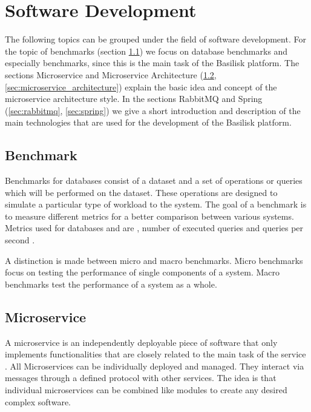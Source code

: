 \section{Software Development}
\label{sec:software_dev}
The following topics can be grouped under the field of software development.
For the topic of benchmarks (section \ref{sec:benchmark}) we focus on database benchmarks and especially \ts{} benchmarks, since this is the main task of the Basilisk platform.
The sections Microservice and Microservice Architecture (\ref{sec:microservice}, \ref{sec:microservice_architecture}) explain the basic idea and concept of the microservice architecture style.
In the sections RabbitMQ and Spring (\ref{sec:rabbitmq}, \ref{sec:spring}) we give a short introduction and description of the main technologies that are used for the development of the Basilisk platform.

\subsection{Benchmark}
\label{sec:benchmark}
Benchmarks for databases consist of a dataset and a set of operations or queries which will be performed on the dataset.
These operations are designed to simulate a particular type of workload to the system.
The goal of a benchmark is to measure different metrics for a better comparison between various systems.
Metrics used for databases and \tsp{} are \eg, number of executed queries and queries per second \cite{IguanaDocsMetrics}.

A distinction is made between micro and macro benchmarks.
Micro benchmarks focus on testing the performance of single components of a system.
Macro benchmarks test the performance of a system as a whole.

\subsection{Microservice}
\label{sec:microservice}
A microservice is an independently deployable piece of software that only implements functionalities that are closely related to the main task of the service \cite{dragoniMicroservicesYesterdayToday2017}.
All Microservices can be individually deployed and managed.
They interact via messages through a defined protocol with other services.
The idea is that individual microservices can be combined like modules to create any desired complex software.


